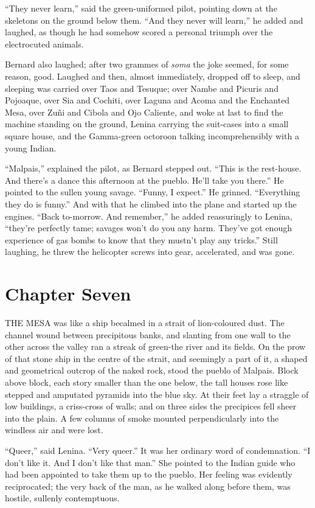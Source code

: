 \documentclass[12pt]{report}
\newcommand{\mychapter}[2]{
\setcounter{chapter}{#1}
    \setcounter{section}{0}
    \chapter*{#2}
    \addcontentsline{toc}{chapter}{#2}
}
\begin{document}
``They never learn,'' said the green-uniformed pilot, pointing down at
the skeletons on the ground below them. ``And they never will learn,''
he added and laughed, as though he had somehow scored a personal triumph
over the electrocuted animals.

Bernard also laughed; after two grammes of \emph{soma} the joke seemed,
for some reason, good. Laughed and then, almost immediately, dropped off
to sleep, and sleeping was carried over Taos and Tesuque; over Nambe and
Picuris and Pojoaque, over Sia and Cochiti, over Laguna and Acoma and
the Enchanted Mesa, over Zuñi and Cibola and Ojo Caliente, and woke at
last to find the machine standing on the ground, Lenina carrying the
suit-cases into a small square house, and the Gamma-green octoroon
talking incomprehensibly with a young Indian.

``Malpais,'' explained the pilot, as Bernard stepped out. ``This is the
rest-house. And there's a dance this afternoon at the pueblo. He'll take
you there.'' He pointed to the sullen young savage. ``Funny, I expect.''
He grinned. ``Everything they do is funny.'' And with that he climbed
into the plane and started up the engines. ``Back to-morrow. And
remember,'' he added reassuringly to Lenina, ``they're perfectly tame;
savages won't do you any harm. They've got enough experience of gas
bombs to know that they mustn't play any tricks.'' Still laughing, he
threw the helicopter screws into gear, accelerated, and was gone.


\mychapter{7}{Chapter Seven}
THE MESA was like a ship becalmed in a strait of lion-coloured dust. The
channel wound between precipitous banks, and slanting from one wall to
the other across the valley ran a streak of green-the river and its
fields. On the prow of that stone ship in the centre of the strait, and
seemingly a part of it, a shaped and geometrical outcrop of the naked
rock, stood the pueblo of Malpais. Block above block, each story smaller
than the one below, the tall houses rose like stepped and amputated
pyramids into the blue sky. At their feet lay a straggle of low
buildings, a criss-cross of walls; and on three sides the precipices
fell sheer into the plain. A few columns of smoke mounted
perpendicularly into the windless air and were lost.

``Queer,'' said Lenina. ``Very queer.'' It was her ordinary word of
condemnation. ``I don't like it. And I don't like that man.'' She
pointed to the Indian guide who had been appointed to take them up to
the pueblo. Her feeling was evidently reciprocated; the very back of the
man, as he walked along before them, was hostile, sullenly contemptuous.
\end{document}
